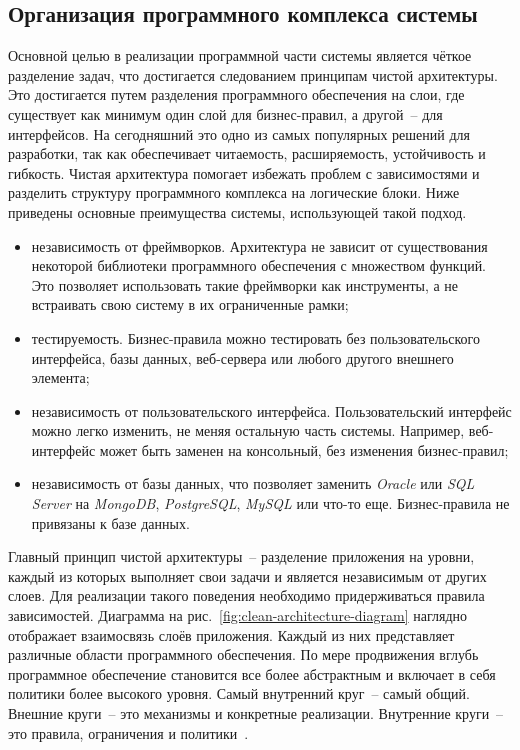 \subsection{Организация программного комплекса системы}
\label{sub:system-implementation:backend-architecture}

Основной целью в реализации программной части системы является чёткое разделение задач, что достигается следованием принципам чистой архитектуры. Это достигается путем разделения программного обеспечения на слои, где существует как минимум один слой для бизнес-правил, а другой~-- для интерфейсов. На сегодняшний это одно из самых популярных решений для разработки, так как обеспечивает читаемость, расширяемость, устойчивость и гибкость. Чистая архитектура помогает избежать проблем с зависимостями и разделить структуру программного комплекса на логические блоки. Ниже приведены основные преимущества системы, использующей такой подход.

\begin{itemize}
    \item независимость от фреймворков. Архитектура не зависит от существования некоторой библиотеки программного обеспечения с множеством функций. Это позволяет использовать такие фреймворки как инструменты, а не встраивать свою систему в их ограниченные рамки;
    \item тестируемость. Бизнес-правила можно тестировать без пользовательского интерфейса, базы данных, веб-сервера или любого другого внешнего элемента;
    \item независимость от пользовательского интерфейса. Пользовательский интерфейс можно легко изменить, не меняя остальную часть системы. Например, веб-интерфейс может быть заменен на консольный, без изменения бизнес-правил;
    \item независимость от базы данных, что позволяет заменить \textit{Oracle} или \textit{SQL Server} на \textit{MongoDB}, \textit{PostgreSQL}, \textit{MySQL} или что-то еще. Бизнес-правила не привязаны к базе данных.
\end{itemize}

Главный принцип чистой архитектуры~-- разделение приложения на уровни, каждый из которых выполняет свои задачи и является независимым от других слоев. Для реализации такого поведения необходимо придерживаться правила зависимостей. Диаграмма на рис.~\ref{fig:clean-architecture-diagram} наглядно отображает взаимосвязь слоёв приложения. Каждый из них представляет различные области программного обеспечения. По мере продвижения вглубь программное обеспечение становится все более абстрактным и включает в себя политики более высокого уровня. Самый внутренний круг~-- самый общий. Внешние круги~-- это механизмы и конкретные реализации. Внутренние круги~-- это правила, ограничения и политики~\cite{web_clean_architecture}.

